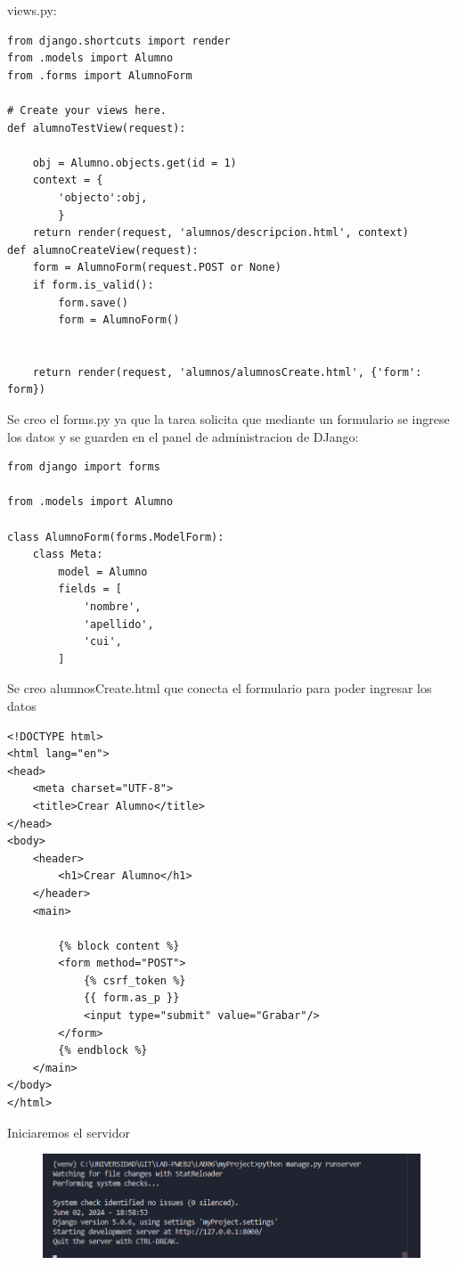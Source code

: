 \documentclass{article}
\begin{document}
\item  views.py:
 
\begin{lstlisting}
from django.shortcuts import render
from .models import Alumno
from .forms import AlumnoForm

# Create your views here.
def alumnoTestView(request):
    
    obj = Alumno.objects.get(id = 1)
    context = {
        'objecto':obj,
        }
    return render(request, 'alumnos/descripcion.html', context)
def alumnoCreateView(request):
    form = AlumnoForm(request.POST or None)
    if form.is_valid():
        form.save()
        form = AlumnoForm()
        
    
    return render(request, 'alumnos/alumnosCreate.html', {'form': form})

\end{lstlisting}
\newpage
 \item Se creo el forms.py ya que la tarea solicita que mediante un formulario se ingrese los datos y se guarden en  el panel de administracion de DJango:
	
\begin{lstlisting}
from django import forms

from .models import Alumno

class AlumnoForm(forms.ModelForm):
    class Meta:
        model = Alumno
        fields = [
            'nombre',
            'apellido',
            'cui',
        ]

\end{lstlisting}

 \item Se creo  alumnosCreate.html que conecta el formulario para poder ingresar los datos
 
\begin{lstlisting}
<!DOCTYPE html>
<html lang="en">
<head>
    <meta charset="UTF-8">
    <title>Crear Alumno</title>
</head>
<body>
    <header>
        <h1>Crear Alumno</h1>
    </header>
    <main>

        {% block content %}
        <form method="POST">
            {% csrf_token %}
            {{ form.as_p }}
            <input type="submit" value="Grabar"/>
        </form>
        {% endblock %}
    </main>
</body>
</html>

\end{lstlisting}

 \item Iniciaremos el servidor
 
     \begin{figure}[H]
           \centering
           \includegraphics[scale=0.7]{latex/img/img5.png}
     \end{figure}
     
\end{document}
